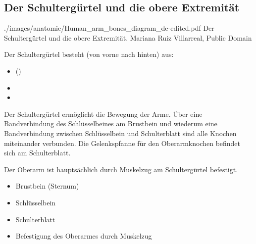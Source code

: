\subsection{Der Schultergürtel und die obere Extremität}
\label{topic:schulterguertel}

{}
{}
{}
{./images/anatomie/Human_arm_bones_diagram_de-edited.pdf}
{Der
Schultergürtel und die obere Extremität.}
{Mariana Ruiz Villarreal, Public Domain}


{
Der Schultergürtel besteht (von vorne nach
hinten) aus:

\begin{itemize}
    \item {}
    ()
    \item {}
    \item {} 
\end{itemize}

Der Schultergürtel ermöglicht die Bewegung der Arme. Über
eine Bandverbindung des Schlüsselbeines am Brustbein und
wiederum eine Bandverbindung zwischen Schlüsselbein und
Schulterblatt sind alle Knochen miteinander verbunden. Die
Gelenkspfanne für den Oberarmknochen befindet sich am
Schulterblatt.

Der Oberarm ist hauptsächlich durch Muskelzug  am Schultergürtel
befestigt.

}
{
\begin{itemize}
    \item Brustbein (Sternum)
    \item Schlüsselbein 
    \item Schulterblatt 
    \item Befestigung des Oberarmes durch Muskelzug
\end{itemize}
}{}{}{}

\clearpage
\subsubsection{}



